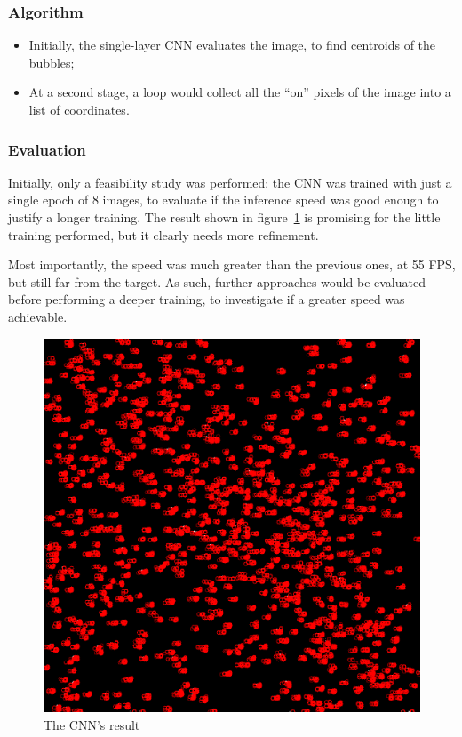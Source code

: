 \subsubsection{Algorithm}

\begin{itemize}
	\itemsep 0em
	\item Initially, the single-layer CNN evaluates the image, to find centroids of the bubbles;
	\item At a second stage, a loop would collect all the ``on'' pixels of the image into a list of coordinates.
\end{itemize}

\subsubsection{Evaluation}

Initially, only a feasibility study was performed: the CNN was trained with just a single epoch of 8 images, to evaluate if the inference speed was good enough to justify a longer training.
The result shown in figure~\ref{fig:locate:cnn} is promising for the little training performed, but it clearly needs more refinement.

Most importantly, the speed was much greater than the previous ones, at 55 FPS, but still far from the target.
As such, further approaches would be evaluated before performing a deeper training, to investigate if a greater speed was achievable.

\begin{figure}
	\centerline{\includegraphics[width=\locateimgsize]{images/locate/cnn.png}}
	\caption{\centering The CNN's result}
	\label{fig:locate:cnn}
\end{figure}

